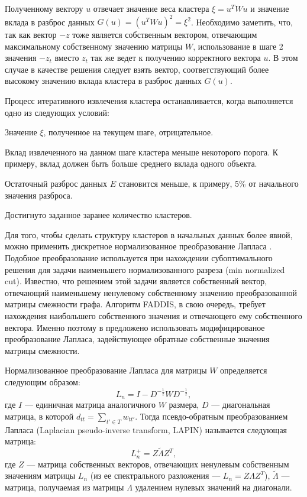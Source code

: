 \documentclass[12pt]{article}
\newenvironment{enumerate*}%
{\begin{enumerate}%
		\setlength{\itemsep}{0pt}%
		\setlength{\parskip}{0pt}}%
	{\end{enumerate}}
\begin{document}
Полученному вектору $u$ отвечает значение веса кластера $\xi=u^TWu$ и значение вклада в разброс данных $G(u)=(u^TWu)^2=\xi^2$. Необходимо заметить, что, так как вектор $-z$ тоже является собственным вектором, отвечающим максимальному собственному значению матрицы $W$, использование в шаге 2 значения $-z_t$ вместо $z_t$ так же ведет к получению корректного вектора $u$. В этом случае в качестве решения следует взять вектор, соответствующий более высокому значению вклада кластера в разброс данных $G(u)$.

Процесс итеративного извлечения кластера останавливается, когда выполняется одно из следующих условий:
\begin{enumerate*}
	\item Значение $\xi$, полученное на текущем шаге, отрицательное.
	\item Вклад извлеченного на данном шаге кластера меньше некоторого порога. К примеру, вклад должен быть больше среднего вклада одного объекта.
	\item Остаточный разброс данных $E$ становится меньше, к примеру, 5\% от начального значения разброса.
	\item Достигнуто заданное заранее количество кластеров.
\end{enumerate*}

Для того, чтобы сделать структуру кластеров в начальных данных более явной, можно применить дискретное нормализованное преобразование Лапласа \cite{von2007tutorial}. Подобное преобразование используется при нахождении субоптимального решения для задачи наименьшего нормализованного разреза (min normalized cut). Известно, что решением этой задачи является собственный вектор, отвечающий наименьшему ненулевому собственному значению преобразованной матрицы смежности графа. Алгоритм FADDIS, в свою очередь, требует нахождения наибольшего собственного значения и отвечающего ему собственного вектора. Именно поэтому в \cite{mirkin2012additive} предложено использовать модифицированое преобразование Лапласа, задействующее обратные собственные значения матрицы смежности. 

Нормализованное преобразование Лапласа для матрицы $W$ определяется следующим образом:
\begin{equation}
	L_n=I-D^{-\frac{1}{2}}WD^{-\frac{1}{2}}, 
\end{equation}
где $I$ --- единичная матрица аналогичного $W$ размера, $D$ --- диагональная матрица, в которой $d_{tt} =\sum_{t'\in T} w_{tt'}$. 
Тогда псевдо-обратным преобразованием Лапласа (Laplacian pseudo-inverse transform, LAPIN) называется следующая матрица:
\begin{equation}
	L_n^+ = Z \tilde{\Lambda} Z^T,
\end{equation}
где $Z$ --- матрица собственных векторов, отвечающих ненулевым собственным значениям матрицы $L_n$ (из ее спектрального разложения --- $L_n=Z\Lambda Z^T$), $\tilde{\Lambda}$ --- матрица, получаемая из матрицы $\Lambda$ удалением нулевых значений на диагонали.
\end{document}

